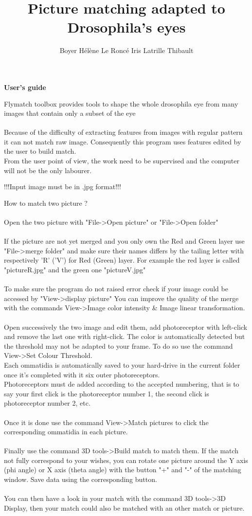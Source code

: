 \documentclass{report}
\author{Boyer Hélène Le Roncé Iris Latrille Thibault}
\title{Picture matching adapted to Drosophila's eyes }
\begin{document}
\begin{center}
{\LARGE \textbf{User's guide}}

\end{center}

Flymatch toolbox provides tools to shape the whole drosophila eye from many images that contain only a subset of the eye\\
\\
Because of the difficulty of extracting features from images with regular pattern it can not match raw image. Consequently this program uses features edited by the user to build match. \\
From the user point of view, the work need to be supervised and the computer will not be the only labourer. 

\begin{center}
!!!Input image must be in .jpg format!!!
\end{center}
How to match two picture ?
\\
\\
Open the two picture with "File->Open picture" or "File->Open folder"
\\
\\
If the picture are not yet merged and you only own the Red and Green layer use "File->merge folder" and make sure their names differs by the tailing letter with respectively 'R' ('V') for Red (Green) layer.
For example the red layer is called "pictureR.jpg" and the green one "pictureV.jpg"
\\
\\
To make sure the program do not raised error check if your image could be accessed by "View->display picture"
You can improve the quality of the merge with the commands View->Image color intensity \& Image linear transformation.
\\
\\
Open successively the two image and edit them, add photoreceptor with left-click and remove the last one with right-click. The color is automatically detected but the threshold may not be adapted to your frame. To do so use the command View->Set Colour Threshold. \\
Each ommatidia is automatically saved to your hard-drive in the current folder once it's completed with it six outer photoreceptors.\\
Photoreceptors must de added according to the accepted numbering, that is to say your first click is the photoreceptor number 1, the second click is photoreceptor number 2, etc.
\\
\\
Once it is done use the command View->Match pictures to click the corresponding ommatidia in each picture. 
\\
\\
Finally use the command 3D tools->Build match to match them. If the match not fully correspond to your wishes, 
 you can rotate one picture around the Y axis (phi angle) or X axis (theta angle) with the button "+" and "-" of the matching window.
Save data using the corresponding button.
\\
\\
You can then have a look in your match with the command 3D tools->3D Display, then your match could also be matched with an other match or picture.
\end{document}
